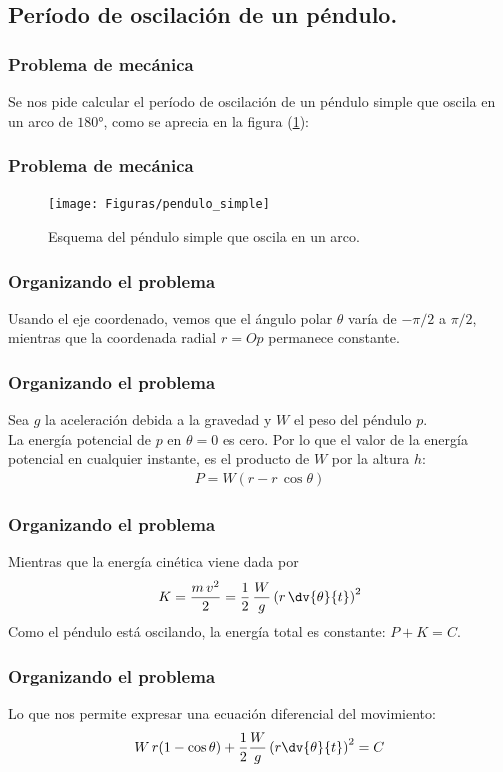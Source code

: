 \subsection{Período de oscilación de un péndulo.}
\begin{frame}
\frametitle{Problema de mecánica}
Se nos pide calcular el período de oscilación de un péndulo simple que oscila en un arco de $\ang{180}$, como se aprecia en la figura (\ref{fig:figura_pendulo_simple}):
\end{frame}
\begin{frame}
\frametitle{Problema de mecánica}
\begin{figure}[!ht]
    \centering
    \texttt{[image: Figuras/pendulo\_simple]}
    \caption{Esquema del péndulo simple que oscila en un arco.}
    \label{fig:figura_pendulo_simple}
\end{figure}
\end{frame}
\begin{frame}
\frametitle{Organizando el problema}
Usando el eje coordenado, vemos que el ángulo polar $\theta$ varía de $-\pi/2$ a $\pi/2$, mientras que la coordenada radial $r = Op$ permanece constante.
\end{frame}
\begin{frame}
\frametitle{Organizando el problema}
Sea $g$ la aceleración debida a la gravedad y $W$ el peso del péndulo $p$.
\\
\bigskip
\pause
La energía potencial de $p$ en $\theta = 0$ es cero. Por lo que el valor de la energía potencial en cualquier instante, es el producto de $W$ por la altura $h$:
\begin{align*}
P = W (r - r \, \cos \theta)
\end{align*}
\end{frame}
\begin{frame}
\frametitle{Organizando el problema}
Mientras que la energía cinética viene dada por
\begin{align*}
K = \dfrac{m \, v^{2}}{2} = \dfrac{1}{2} \, \dfrac{W}{g} \left( r \, \dv{\theta}{t} \right)^{2}
\end{align*}
Como el péndulo está oscilando, la energía total es constante: $P + K = C$.
\end{frame}
\begin{frame}
\frametitle{Organizando el problema}
Lo que nos permite expresar una ecuación diferencial del movimiento:
\begin{align*}
W \, r (1 - \cos \theta) + \dfrac{1}{2} \dfrac{W}{g} \left( r \dv{\theta}{t} \right)^{2} = C
\end{align*}
\end{frame}
